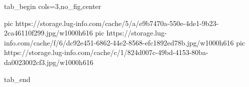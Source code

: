  
 
 
 
 


\ifcmt
  tab_begin cols=3,no_fig,center

     pic https://storage.lug-info.com/cache/5/a/e9b7470a-550e-4de1-9b23-2ca46110f299.jpg/w1000h616%
		 pic https://storage.lug-info.com/cache/f/6/dc92e451-6862-44e2-8568-efc1892ed78b.jpg/w1000h616%
		 pic https://storage.lug-info.com/cache/c/1/824d007c-49bd-4153-80ba-da0023002cf3.jpg/w1000h616%

  tab_end
\fi
